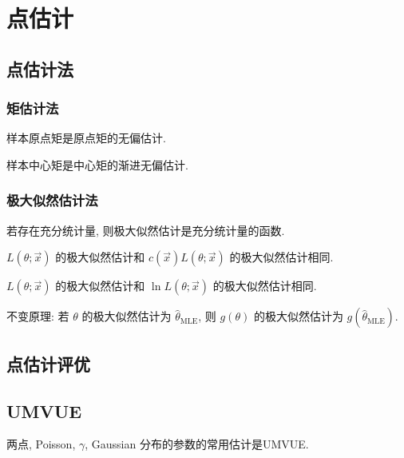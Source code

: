 \chapter{点估计}

\section{点估计法}

\subsection{矩估计法}

样本原点矩是原点矩的无偏估计.

样本中心矩是中心矩的渐进无偏估计.

\subsection{极大似然估计法}

若存在充分统计量, 则极大似然估计是充分统计量的函数.

$L(\theta;\vec{x})$ 的极大似然估计和 $c(\vec{x})L(\theta;\vec{x})$ 的极大似然估计相同.

$L(\theta;\vec{x})$ 的极大似然估计和 $\ln L(\theta;\vec{x})$ 的极大似然估计相同.

不变原理: 若 $\theta$ 的极大似然估计为 $\hat{\theta}_{\text{MLE}}$, 则 $g(\theta)$ 的极大似然估计为 $g(\hat{\theta}_{\text{MLE}})$.

\section{点估计评优}

\section{UMVUE}

两点, Poisson, $\gamma$, Gaussian 分布的参数的常用估计是UMVUE.
